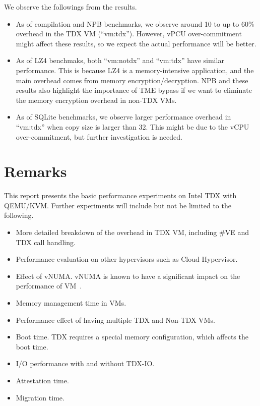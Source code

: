 \documentclass[letterpaper,twocolumn,10pt]{article}
\begin{document}
We observe the followings from the results.
\begin{itemize}
    \item As of compilation and NPB benchmarks, we observe around 10 to up to 60\% overhead in the TDX VM (``vm:tdx''). However, vPCU over-commitment might affect these results, so we expect the actual performance will be better.
    \item As of LZ4 benchmaks, both ``vm:notdx'' and ``vm:tdx'' have similar performance. This is because LZ4 is a memory-intensive application, and the main overhead comes from memory encryption/decryption. NPB and these results also highlight the importance of TME bypass if we want to eliminate the memory encryption overhead in non-TDX VMs.
    \item As of SQLite benchmarks, we observe larger performance overhead in ``vm:tdx'' when copy size is larger than 32. This might be due to the vCPU over-commitment, but further investigation is needed.
\end{itemize}

\section{Remarks}
This report presents the basic performance experiments on Intel TDX with QEMU/KVM.
Further experiments will include but not be limited to the following.

\begin{itemize}
    \item More detailed breakdown of the overhead in TDX VM, including \#VE and TDX call handling.
    \item Performance evaluation on other hypervisors such as Cloud Hypervisor.
    \item Effect of vNUMA. vNUMA is known to have a significant impact on the performance of VM~\cite{sev_eval}.
    \item Memory management time in VMs.
    \item Performance effect of having multiple TDX and Non-TDX VMs.
    \item Boot time. TDX requires a special memory configuration, which affects the boot time.
    \item I/O performance with and without TDX-IO.
    \item Attestation time.
    \item Migration time.
\end{itemize}


% 
\printbibliography
\end{document}
